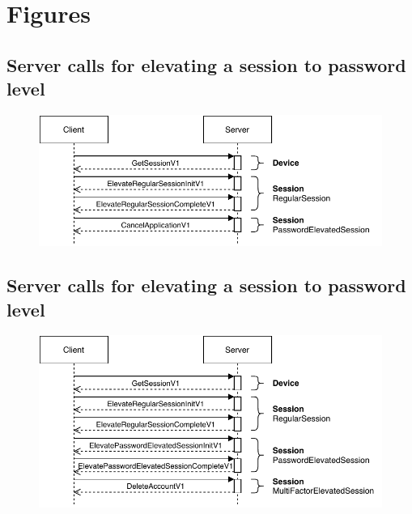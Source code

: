\newpage

\section{Figures}

\subsection{Server calls for elevating a session to password level}

\begin{figure}[!htb]
    \includegraphics[width=\textwidth]{figures/elevate-to-password-session.pdf}
\end{figure}

\subsection{Server calls for elevating a session to password level}

\begin{figure}[!htb]
    \includegraphics[width=\textwidth]{figures/elevate-to-mfa-session.pdf}
\end{figure}
